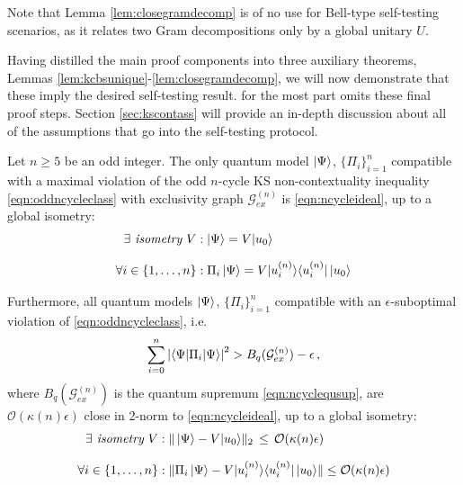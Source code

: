 Note that Lemma \ref{lem:closegramdecomp} is of no use for Bell-type self-testing scenarios, as it relates two Gram decompositions only by a global unitary $U$.

Having distilled the main proof components into three auxiliary theorems, Lemmas \ref{lem:kcbsunique}-\ref{lem:closegramdecomp}, we will now demonstrate that these imply the desired self-testing result. \cite{Bharti2019} for the most part omits these final proof steps. Section \ref{sec:kscontass} will provide an in-depth discussion about all of the assumptions that go into the self-testing protocol.

\begin{theorem}
\label{thm:contselftesting}\hfill\break
Let $n\geq5$ be an odd integer. The only quantum model $\ket{\Psi}$, $\{\Pi_i\}_{i=1}^n$ compatible with a maximal violation of the odd $n$-cycle KS non-contextuality inequality \ref{eqn:oddncycleclass} with exclusivity graph $\mathcal{G}_{ex}^{(n)}$ is \ref{eqn:ncycleideal}, up to a global isometry:
\begin{align*}
    \exists \emph{ isometry } V & : \ket{\Psi} = V \vert u_0\rangle \\[0.7em]
    \forall i\in\{1,\dots,n\} & : \Pi_i \ket{\Psi} = V \vert u_i^{(n)} \rangle \langle u_i^{(n)} \vert \thinspace \vert u_0 \rangle
\end{align*}

Furthermore, all quantum models $\ket{\Psi}$, $\{\Pi_i\}_{i=1}^n$ compatible with an $\epsilon$-suboptimal violation of \ref{eqn:oddncycleclass}, i.e.\
\begin{equation*}
    \sum_{i=0}^n \abs{\langle \Psi \vert \Pi_i \vert \Psi \rangle}^2> B_q(\mathcal{G}_{ex}^{(n)})-\epsilon\thinspace ,
\end{equation*}where $B_q(\mathcal{G}_{ex}^{(n)})$ is the quantum supremum \ref{eqn:ncyclequsup}, are $\mathcal{O}(\kappa(n)\epsilon)$ close in 2-norm to \ref{eqn:ncycleideal}, up to a global isometry:
\begin{align*}
    \exists \emph{ isometry } V & : \| \ket{\Psi} - V \vert u_0\rangle \|_2 \thinspace\leq\thinspace \mathcal{O}(\kappa(n)\epsilon)\\[0.7em]
    \forall i\in\{1,\dots,n\} & : \| \Pi_i \ket{\Psi} - V \vert u_i^{(n)} \rangle \langle u_i^{(n)} \vert \thinspace \vert u_0 \rangle \| \leq \mathcal{O}(\kappa(n)\epsilon)
\end{align*}
\end{theorem}

